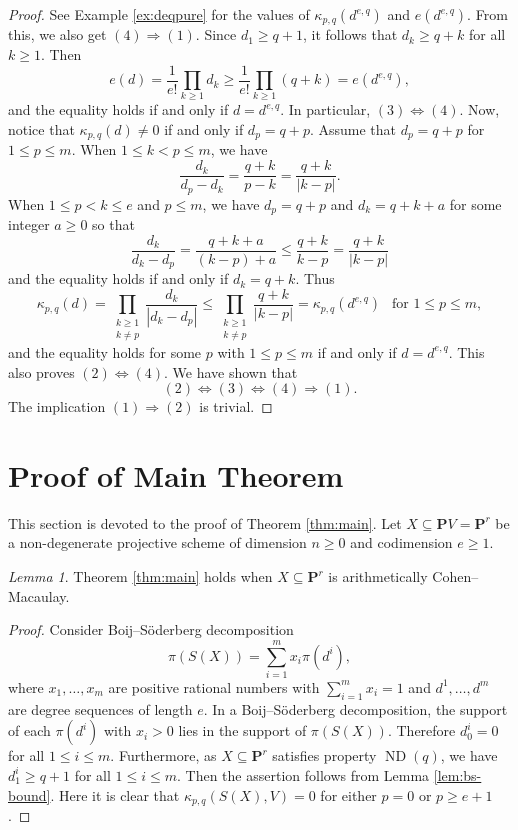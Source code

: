 \documentclass[12pt]{amsart}
\theoremstyle{definition}
\theoremstyle{remark}
\theoremstyle{corollary}
\theoremstyle{theorem}
\theoremstyle{corollary}
\newtheorem{lemma}[theorem]{Lemma}
\theoremstyle{corollary}
\theoremstyle{definition}
\theoremstyle{remark}
\numberwithin{equation}{section}
\def\nP{\mathbf{P}}
\DeclareMathOperator{\ND}{ND}
\begin{document}
\begin{proof}
See Example \ref{ex:deqpure} for the values of $\kappa_{p,q}(d^{e,q})$ and $e(d^{e,q})$. From this, we also get $(4) \Longrightarrow (1)$.
Since $d_1 \geq q+1$, it follows that $d_k \geq q+k$ for all $k \geq 1$. 
Then
$$
e(d)=\frac{1}{e!} \prod_{k \geq 1} d_k \geq \frac{1}{e!} \prod_{k \geq 1} (q+k) = e(d^{e,q}), 
$$
and the equality holds if and only if $d=d^{e,q}$. In particular, $(3) \Longleftrightarrow (4)$. Now, notice that $\kappa_{p,q}(d) \neq 0$ if and only if $d_p=q+p$. Assume that $d_p=q+p$ for $1 \leq p \leq m$. 
When $1 \leq k < p \leq m$, we have
$$
\frac{d_k}{d_p-d_k} = \frac{q+k}{p-k} = \frac{q+k}{|k-p|}.
$$
When $1 \leq p < k \leq e$ and $p \leq m$, we have $d_p=q+p$ and $d_k=q+k+a$ for some integer $a \geq 0$ so that
$$
\frac{d_k}{d_k-d_p} = \frac{q+k+a}{(k-p)+a} \leq \frac{q+k}{k-p} = \frac{q+k}{|k-p|}
$$
and the equality holds if and only if $d_k=q+k$.
Thus
$$
\kappa_{p,q}(d)=\prod_{\substack{k \geq 1 \\ k \neq p}} \frac{d_k}{|d_k - d_p|} \leq \prod_{\substack{k \geq 1 \\ k \neq p}} \frac{q+k}{|k-p|} = \kappa_{p,q}(d^{e,q})~~\text{ for $1 \leq p \leq m$},
$$
and the equality holds for some $p$ with $1 \leq p \leq m$ if and only if $d=d^{e,q}$. This also proves $(2) \Longleftrightarrow (4)$. We have shown that 
$$
(2) \Longleftrightarrow (3) \Longleftrightarrow (4) \Longrightarrow (1).
$$
The implication $(1) \Longrightarrow (2)$ is trivial.
\end{proof}


\section{Proof of Main Theorem}\label{sec:proof}

This section is devoted to the proof of Theorem \ref{thm:main}. Let $X \subseteq \nP V = \nP^r$ be a non-degenerate projective scheme of dimension $n \geq 0$ and codimension $e \geq 1$.

\begin{lemma}\label{lem:thmforaCM}
Theorem \ref{thm:main} holds when $X \subseteq \nP^r$ is arithmetically Cohen--Macaulay.  
\end{lemma}

\begin{proof}
Consider Boij--S\"{o}derberg decomposition 
$$
\pi(S(X)) = \sum_{i=1}^m x_i \pi(d^i),
$$
where $x_1, \ldots, x_m$ are positive rational numbers with $\sum_{i=1}^m x_i = 1$ and $d^1, \ldots, d^m$ are degree sequences of length $e$. In a Boij--S\"{o}derberg decomposition, the support of each $\pi(d^i)$ with $x_i>0$ lies in the support of $\pi(S(X))$. Therefore $d_0^i = 0$ for all $1\le i \le m$.
Furthermore, as $X \subseteq \nP^r$ satisfies property $\ND(q)$, we have $d_1^i \geq q+1$ for all $1 \leq i \leq m$. Then the assertion follows from Lemma \ref{lem:bs-bound}. Here it is clear that $\kappa_{p,q}(S(X), V) = 0$ for either $p=0$ or $p \geq e+1$. 
\end{proof}
\end{document}
